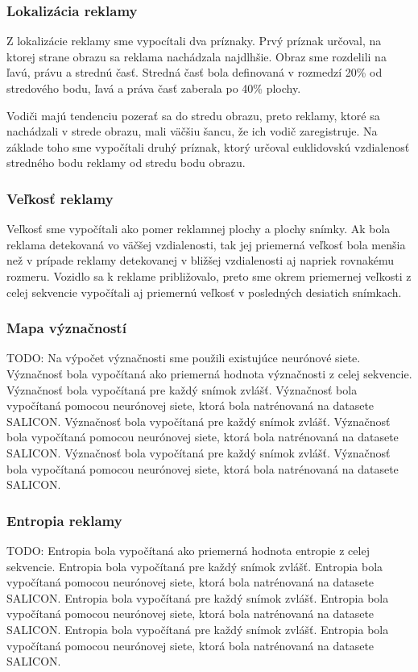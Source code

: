 \subsubsection{Lokalizácia reklamy}

Z lokalizácie reklamy sme vypocítali dva príznaky. Prvý príznak určoval, na ktorej strane obrazu sa reklama nachádzala najdlhšie. Obraz sme rozdelili na ľavú, právu a strednú časť. Stredná časť bola definovaná v rozmedzí 20\% od stredového bodu, ľavá a práva časť zaberala po 40\% plochy.

Vodiči majú tendenciu pozerať sa do stredu obrazu, preto reklamy, ktoré sa nachádzali v strede obrazu, mali väčšiu šancu, že ich vodič zaregistruje. Na základe toho sme vypočítali druhý príznak, ktorý určoval euklidovskú vzdialenosť stredného bodu reklamy od stredu bodu obrazu.

\subsubsection{Veľkosť reklamy}

Veľkosť sme vypočítali ako pomer reklamnej plochy a plochy snímky. Ak bola reklama detekovaná vo väčšej vzdialenosti, tak jej priemerná veľkosť bola menšia než v prípade reklamy detekovanej v bližšej vzdialenosti aj napriek rovnakému rozmeru. Vozidlo sa k reklame približovalo, preto sme okrem priemernej veľkosti z celej sekvencie vypočítali aj priemernú veľkosť v posledných desiatich snímkach.

\subsubsection{Mapa význačností}

TODO: Na výpočet význačnosti sme použili existujúce neurónové siete. Význačnosť bola vypočítaná ako priemerná hodnota význačnosti z celej sekvencie. Význačnosť bola vypočítaná pre každý snímok zvlášť. Význačnosť bola vypočítaná pomocou neurónovej siete, ktorá bola natrénovaná na datasete SALICON. Význačnosť bola vypočítaná pre každý snímok zvlášť. Význačnosť bola vypočítaná pomocou neurónovej siete, ktorá bola natrénovaná na datasete SALICON. Význačnosť bola vypočítaná pre každý snímok zvlášť. Význačnosť bola vypočítaná pomocou neurónovej siete, ktorá bola natrénovaná na datasete SALICON.

\subsubsection{Entropia reklamy}

TODO: Entropia bola vypočítaná ako priemerná hodnota entropie z celej sekvencie. Entropia bola vypočítaná pre každý snímok zvlášť. Entropia bola vypočítaná pomocou neurónovej siete, ktorá bola natrénovaná na datasete SALICON. Entropia bola vypočítaná pre každý snímok zvlášť. Entropia bola vypočítaná pomocou neurónovej siete, ktorá bola natrénovaná na datasete SALICON. Entropia bola vypočítaná pre každý snímok zvlášť. Entropia bola vypočítaná pomocou neurónovej siete, ktorá bola natrénovaná na datasete SALICON.